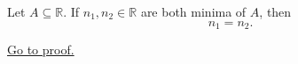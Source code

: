 \begin{proposition}
\label{prop:uniqueness-of-the-minimum}
Let $A\subseteq\mathbb{R}$. If $n_1,n_2\in\mathbb{R}$ are both minima of
$A$, then
\[
  n_1=n_2.
\]

\hyperref[prf:uniqueness-of-the-minimum]{Go to proof.}
\end{proposition}